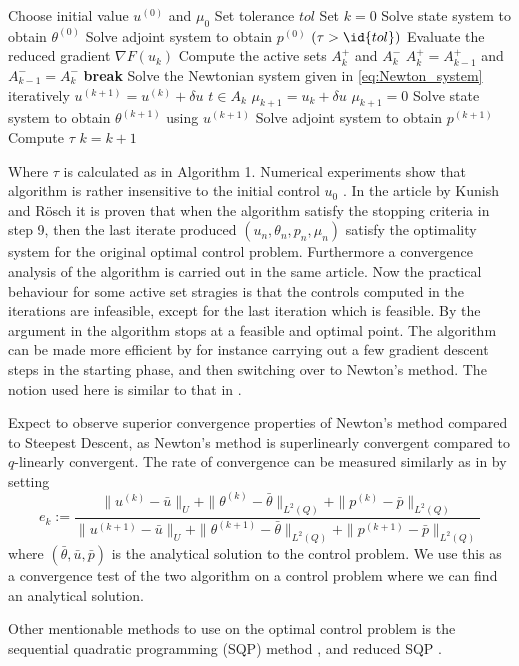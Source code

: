 \begin{codebox}
\li Choose initial value $u^{(0)}$ and $\mu_0$ 
\li Set tolerance $tol$
\li Set $k = 0$
\li Solve state system to obtain $\theta^{(0)}$
\li Solve adjoint system to obtain $p^{(0)}$
\li \While $(\tau > \id{tol})$ \Then 
\li Evaluate the reduced gradient $\nabla F(u_k)$
\li Compute the active sets $A_k^{+}$ and $A_k^{-}$
\li \If $A_k^{+} = A_{k-1}^{+}$ and $A_{k-1}^{-} = A_k^{-}$ \Then 
\li \textbf{break} \End
\li Solve the Newtonian system given in \eqref{eq:Newton_system} iteratively
\li $u^{(k+1)} = u^{(k)} + \delta u$  
\li \If $t \in A_k$ \Then
    \li $\mu_{k+1} = u_k + \delta u$
    \li \Else $\mu_{k+1} = 0$ 
    \End
\li Solve state system to obtain $\theta^{(k+1)}$ using $u^{(k+1)}$
\li Solve adjoint system to obtain $p^{(k+1)}$ 
\li Compute $\tau$
\li $k = k+1$
\end{codebox}

Where $\tau$ is calculated as in Algorithm 1.  Numerical experiments show that algorithm is rather insensitive to the initial control $u_0$  \cite{primal_dual}. In the article by Kunish and Rösch \cite{primal_dual} it is proven that when the algorithm satisfy the stopping criteria in step 9, then the last iterate produced $(u_n, \theta_n, p_n, \mu_n)$ satisfy the optimality system for the original optimal control problem. Furthermore a convergence analysis of the algorithm is carried out in the same article. Now the practical behaviour for some active set stragies is that the controls computed in the iterations are infeasible, except for the last iteration which is feasible. By the argument in \cite{primal_dual} the algorithm stops at a feasible and optimal point. The algorithm can be made more efficient by for instance carrying out a few gradient descent steps in the starting phase, and then switching over to Newton's method. The notion used here is similar to that in \cite{Algorithms}. \bigskip

Expect to observe superior convergence properties of Newton's method compared to Steepest Descent, as Newton's method is superlinearly convergent compared to $q$-linearly convergent. The rate of convergence can be measured similarly as in \cite{DPSteel} by setting 
\begin{equation}
    \label{eq:rate_of_conv}
    e_k := \frac{\|u^{(k)}-\bar{u}\|_U + \|\theta^{(k)}-\bar{\theta}\|_{L^2(Q)} +\|p^{(k)}-\bar{p}\|_{L^2(Q)} }{\|u^{(k+1)}-\bar{u}\|_U + \|\theta^{(k+1)}-\bar{\theta}\|_{L^2(Q)} +\|p^{(k+1)}-\bar{p}\|_{L^2(Q)}}
\end{equation}
where $(\bar{\theta},\bar{u},\bar{p})$ is the analytical solution to the control problem. We use this as a convergence test of the two algorithm on a control problem where we can find an analytical solution. 

Other mentionable methods to use on the optimal control problem is the sequential quadratic programming (SQP) method \cite{Algorithms}, and reduced SQP \cite{DPSteel}. 
